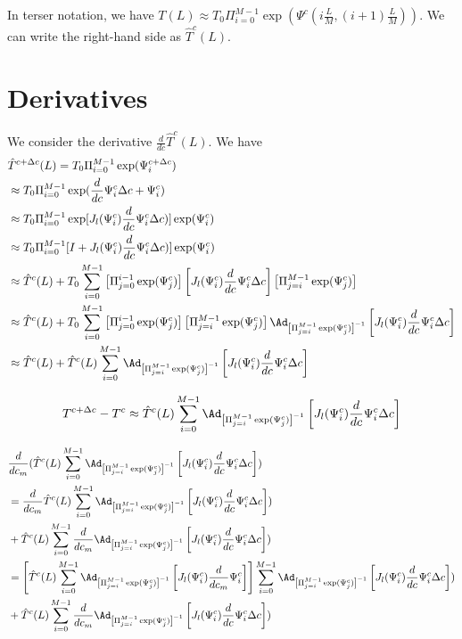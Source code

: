 \documentclass[12pt]{article}
\begin{document}
In terser notation, we have $T(L) \approx T_0 \Pi_{i=0}^{M-1} \exp(\Psi^c(i\frac{L}{M}, (i+1)\frac{L}{M}))$. We can write the right-hand side as $\hat T^c(L)$.

\section{Derivatives}

We consider the derivative $\frac{d}{dc} \hat T^c(L)$.
We have
\[
\begin{aligned}
  &\hat T^{c+\Delta c}(L) =  T_0 \Pi_{i=0}^{M-1} \exp(\Psi^{c+ \Delta c}_i)\\
  &\approx T_0 \Pi_{i=0}^{M-1} \exp(\frac{d}{dc}\Psi^c_i \Delta c + \Psi^c_i)\\
  &\approx T_0 \Pi_{i=0}^{M-1} \exp[J_l(\Psi^c_i) \frac{d}{dc}\Psi^c_i \Delta c)] \exp(\Psi^c_i)\\
  &\approx T_0 \Pi_{i=0}^{M-1} [I + J_l(\Psi^c_i)\frac{d}{dc}\Psi^c_i \Delta c)] \exp(\Psi^c_i)\\
  &\approx \hat T^{c}(L) + T_0\sum_{i=0}^{M-1}\left[\Pi_{j=0}^{i-1} \exp(\Psi^c_j)\right]  \left[J_l(\Psi^c_i)\frac{d}{dc}\Psi^c_i \Delta c\right] \left[\Pi_{j=i}^{M-1} \exp(\Psi^c_j)\right]\\
  &\approx \hat T^{c}(L) + T_0\sum_{i=0}^{M-1}\left[\Pi_{j=0}^{i-1} \exp(\Psi^c_j)\right]   \left[\Pi_{j=i}^{M-1} \exp(\Psi^c_j)\right] \Ad_{\left[\Pi_{j=i}^{M-1} \exp(\Psi^c_j)\right]^{-1}}\left[J_l(\Psi^c_i)\frac{d}{dc}\Psi^c_i \Delta c\right]\\
  &\approx \hat T^{c}(L) + \hat T^{c}(L) \sum_{i=0}^{M-1}\Ad_{\left[\Pi_{j=i}^{M-1} \exp(\Psi^c_j)\right]^{-1}}\left[J_l(\Psi^c_i)\frac{d}{dc}\Psi^c_i \Delta c\right]\\ 
\end{aligned}
\]

$$T^{c + \Delta c} - T^c  \approx  \hat T^{c}(L) \sum_{i=0}^{M-1}\Ad_{\left[\Pi_{j=i}^{M-1} \exp(\Psi^c_j)\right]^{-1}}\left[J_l(\Psi^c_i)\frac{d}{dc}\Psi^c_i \Delta c\right]$$

\[
  \begin{aligned}
    &\frac{d}{dc_m} (\hat T^{c}(L) \sum_{i=0}^{M-1}\Ad_{\left[\Pi_{j=i}^{M-1} \exp(\Psi^c_j)\right]^{-1}}\left[J_l(\Psi^c_i)\frac{d}{dc}\Psi^c_i \Delta c\right]) \\
    &=\frac{d}{dc_m} \hat T^{c}(L) \sum_{i=0}^{M-1}\Ad_{\left[\Pi_{j=i}^{M-1} \exp(\Psi^c_j)\right]^{-1}}\left[J_l(\Psi^c_i)\frac{d}{dc}\Psi^c_i \Delta c\right]) \\
    &+  \hat T^{c}(L) \sum_{i=0}^{M-1}\frac{d}{dc_m} \Ad_{\left[\Pi_{j=i}^{M-1} \exp(\Psi^c_j)\right]^{-1}}\left[J_l(\Psi^c_i)\frac{d}{dc}\Psi^c_i \Delta c\right])\\
    &=\left[\hat T^{c}(L) \sum_{i=0}^{M-1}\Ad_{\left[\Pi_{j=i}^{M-1} \exp(\Psi^c_j)\right]^{-1}}\left[J_l(\Psi^c_i)\frac{d}{dc_m}\Psi^c_i\right]\right] \sum_{i=0}^{M-1}\Ad_{\left[\Pi_{j=i}^{M-1} \exp(\Psi^c_j)\right]^{-1}}\left[J_l(\Psi^c_i)\frac{d}{dc}\Psi^c_i \Delta c\right]) \\
    &+  \hat T^{c}(L) \sum_{i=0}^{M-1}\frac{d}{dc_m} \Ad_{\left[\Pi_{j=i}^{M-1} \exp(\Psi^c_j)\right]^{-1}}\left[J_l(\Psi^c_i)\frac{d}{dc}\Psi^c_i \Delta c\right])    
  \end{aligned}
\]
\end{document}
